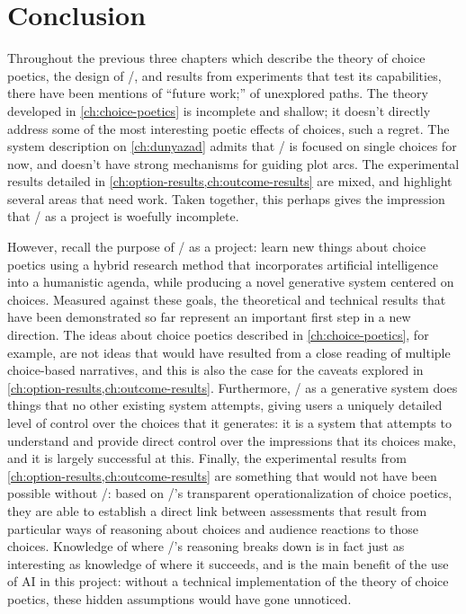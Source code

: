 \chapter{Conclusion}

\label{ch:conclusion}

Throughout the previous three chapters which describe the theory of choice poetics, the design of \dunyazad/, and results from experiments that test its capabilities, there have been mentions of ``future work;'' of unexplored paths.
%
The theory developed in \cref{ch:choice-poetics} is incomplete and shallow; it doesn't directly address some of the most interesting poetic effects of choices, such a regret.
%
The system description on \cref{ch:dunyazad} admits that \dunyazad/ is focused on single choices for now, and doesn't have strong mechanisms for guiding plot arcs.
%
The experimental results detailed in \cref{ch:option-results,ch:outcome-results} are mixed, and highlight several areas that need work.
%
Taken together, this perhaps gives the impression that \dunyazad/ as a project is woefully incomplete.


However, recall the purpose of \dunyazad/ as a project: learn new things about choice poetics using a hybrid research method that incorporates artificial intelligence into a humanistic agenda, while producing a novel generative system centered on choices.
%
Measured against these goals, the theoretical and technical results that have been demonstrated so far represent an important first step in a new direction.
%
The ideas about choice poetics described in \cref{ch:choice-poetics}, for example, are not ideas that would have resulted from a close reading of multiple choice-based narratives, and this is also the case for the caveats explored in \cref{ch:option-results,ch:outcome-results}.
%
Furthermore, \dunyazad/ as a generative system does things that no other existing system attempts, giving users a uniquely detailed level of control over the choices that it generates: it is a system that attempts to understand and provide direct control over the impressions that its choices make, and it is largely successful at this.
%
Finally, the experimental results from \cref{ch:option-results,ch:outcome-results} are something that would not have been possible without \dunyazad/: based on \dunyazad/'s transparent operationalization of choice poetics, they are able to establish a direct link between assessments that result from particular ways of reasoning about choices and audience reactions to those choices.
%
Knowledge of where \dunyazad/'s reasoning breaks down is in fact just as interesting as knowledge of where it succeeds, and is the main benefit of the use of AI in this project: without a technical implementation of the theory of choice poetics, these hidden assumptions would have gone unnoticed.


